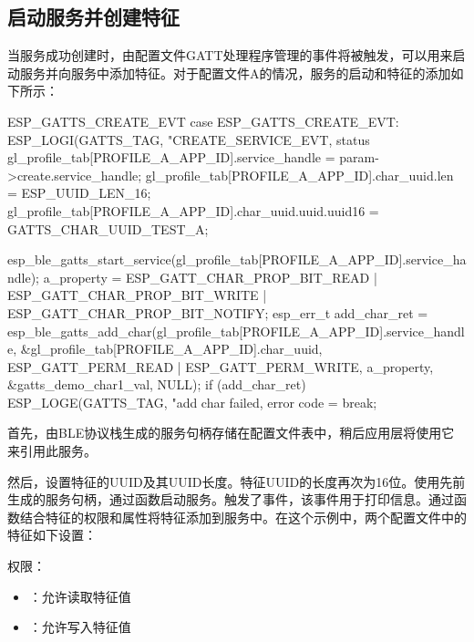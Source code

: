 \documentclass[lang=cn,newtx,10pt,scheme=chinese]{elegantbook}
\begin{document}
\subsection{启动服务并创建特征}

当服务成功创建时，由配置文件GATT处理程序管理的事件将被触发，可以用来启动服务并向服务中添加特征。对于配置文件A的情况，服务的启动和特征的添加如下所示：

\begin{mycode}{ESP\_GATTS\_CREATE\_EVT}
case ESP_GATTS_CREATE_EVT:
     ESP_LOGI(GATTS_TAG, "CREATE_SERVICE_EVT, status %
     gl_profile_tab[PROFILE_A_APP_ID].service_handle = param->create.service_handle;
     gl_profile_tab[PROFILE_A_APP_ID].char_uuid.len = ESP_UUID_LEN_16;
     gl_profile_tab[PROFILE_A_APP_ID].char_uuid.uuid.uuid16 = GATTS_CHAR_UUID_TEST_A;  

     esp_ble_gatts_start_service(gl_profile_tab[PROFILE_A_APP_ID].service_handle);
     a_property = ESP_GATT_CHAR_PROP_BIT_READ | ESP_GATT_CHAR_PROP_BIT_WRITE | ESP_GATT_CHAR_PROP_BIT_NOTIFY;
     esp_err_t add_char_ret =  
     esp_ble_gatts_add_char(gl_profile_tab[PROFILE_A_APP_ID].service_handle,  
                            &gl_profile_tab[PROFILE_A_APP_ID].char_uuid,  
                            ESP_GATT_PERM_READ | ESP_GATT_PERM_WRITE,  
                            a_property,  
                            &gatts_demo_char1_val,  
                            NULL);
    if (add_char_ret){
        ESP_LOGE(GATTS_TAG, "add char failed, error code =%
    }
    break;
\end{mycode}

首先，由BLE协议栈生成的服务句柄存储在配置文件表中，稍后应用层将使用它来引用此服务。

然后，设置特征的UUID及其UUID长度。特征UUID的长度再次为16位。使用先前生成的服务句柄，通过函数启动服务。触发了事件，该事件用于打印信息。通过函数结合特征的权限和属性将特征添加到服务中。在这个示例中，两个配置文件中的特征如下设置：

权限：

\begin{itemize}
\item {}：允许读取特征值
\item {}：允许写入特征值
\end{itemize}
\end{document}

